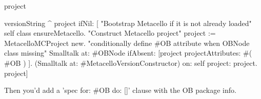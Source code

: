 \documentclass[a4paper,10pt,twoside]{book}
\begin{document}
\begin{code}{}
project

   versionString  
 ^ project ifNil: [
   "Bootstrap Metacello if it is not already loaded"
   self class ensureMetacello.
   "Construct Metacello project"
   project := MetacelloMCProject new.
   "conditionally define #OB attribute when OBNode class missing"
   Smalltalk at: #OBNode ifAbsent: [project projectAttributes: #( #OB ) ].
   (Smalltalk at: #MetacelloVersionConstructor) on: self project: project.
   project]
  \end{code}

Then you'd add a 'spec for: \#OB do: []' clause with the OB package info.


\ifx\wholebook\relax\else
\end{document}
